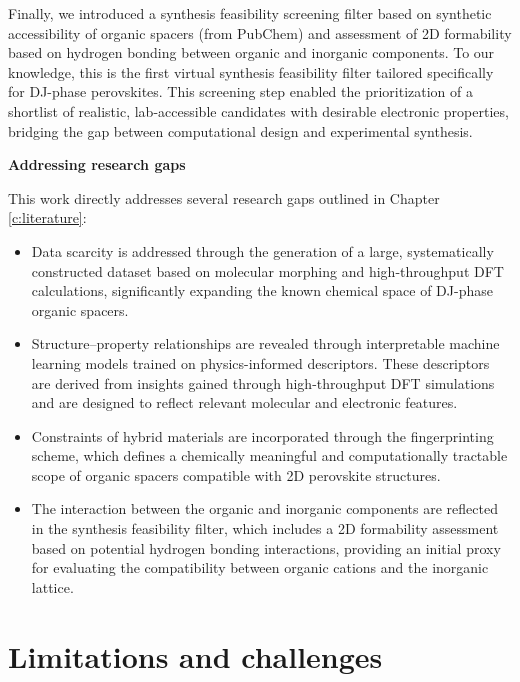 Finally, we introduced a synthesis feasibility screening filter based on synthetic accessibility of organic spacers (from PubChem) and assessment of 2D formability based on hydrogen bonding between organic and inorganic components. To our knowledge, this is the first virtual synthesis feasibility filter tailored specifically for DJ-phase perovskites. This screening step enabled the prioritization of a shortlist of realistic, lab-accessible candidates with desirable electronic properties, bridging the gap between computational design and experimental synthesis.

\textbf{Addressing research gaps}

This work directly addresses several research gaps outlined in Chapter \ref{c:literature}:
\begin{itemize}
    \item Data scarcity is addressed through the generation of a large, systematically constructed dataset based on molecular morphing and high-throughput DFT calculations, significantly expanding the known chemical space of DJ-phase organic spacers.

    \item Structure–property relationships are revealed through interpretable machine learning models trained on physics-informed descriptors. These descriptors are derived from insights gained through high-throughput DFT simulations and are designed to reflect relevant molecular and electronic features.

    \item Constraints of hybrid materials are incorporated through the fingerprinting scheme, which defines a chemically meaningful and computationally tractable scope of organic spacers compatible with 2D perovskite structures. 
    \item The interaction between the organic and inorganic components are reflected in the synthesis feasibility filter, which includes a 2D formability assessment based on potential hydrogen bonding interactions, providing an initial proxy for evaluating the compatibility between organic cations and the inorganic lattice.

\end{itemize}


\section{Limitations and challenges}

